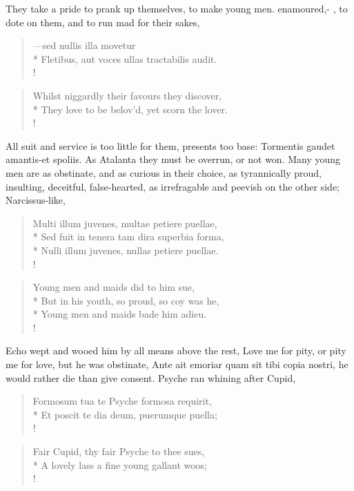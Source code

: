 They take a pride to prank up themselves, to make young men. enamoured,-
,
 to dote on them, and to run mad for their sakes,

\begin{latin}
\begin{verse}%
---sed nullis illa movetur\\*
Fletibus, aut voces ullas tractabilis audit.\\!
\end{verse}%
\end{latin}
\translationrule%
\begin{verse}%
Whilst niggardly their favours they discover,\\*
They love to be belov'd, yet scorn the lover.\\!
\end{verse}%
%

All suit and service is too little for them, presents too base:
Tormentis gaudet amantis-et spoliis. As Atalanta they must be overrun,
or not won. Many young men are as obstinate, and as curious in their
choice, as tyrannically proud, insulting, deceitful, false-hearted, as
irrefragable and peevish on the other side; Narcissus-like,

\begin{latin}
\begin{verse}%
Multi illum juvenes, multae petiere puellae,\\*
Sed fuit in tenera tam dira superbia forma,\\*
Nulli illum juvenes, nullas petiere puellae.\\!
\end{verse}%
\end{latin}
\translationrule%
\begin{verse}%
Young men and maids did to him sue,\\*
But in his youth, so proud, so coy was he,\\*
Young men and maids bade him adieu.\\!
\end{verse}%
%

Echo wept and wooed him by all means above the rest, Love me for pity,
or pity me for love, but he was obstinate, Ante ait emoriar quam sit
tibi copia nostri, he would rather die than give consent. Psyche ran
whining after Cupid,

\begin{latin}
\begin{verse}%
Formosum tua te Psyche formosa requirit,\\*
Et poscit te dia deum, puerumque puella;\\!
\end{verse}%
\end{latin}
\translationrule%
\begin{verse}%
Fair Cupid, thy fair Psyche to thee sues,\\*
A lovely lass a fine young gallant woos;\\!
\end{verse}%
%

